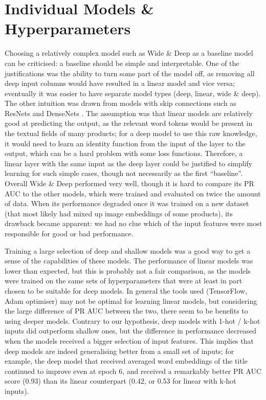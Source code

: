 \section{Individual Models \& Hyperparameters}

Choosing a relatively complex model such as Wide \& Deep as a baseline model can be criticised: a baseline should be simple and interpretable.
One of the justifications was the ability to turn some part of the model off, as removing all deep input columns would have resulted in a linear model and vice versa; eventually it was easier to have separate model types (deep, linear, wide \& deep).
The other intuition was drawn from models with skip connections such as ResNets \cite{resnet} and DenseNets \cite{densenet}.
The assumption was that linear models are relatively good at predicting the output, as the relevant word tokens would be present in the textual fields of many products; for a deep model to use this raw knowledge, it would need to learn an identity function from the input of the layer to the output, which can be a hard problem with some loss functions.
Therefore, a linear layer with the same input as the deep layer could be justified to simplify learning for such simple cases, though not necessarily as the first ``baseline''.
Overall Wide \& Deep performed very well, though it is hard to compare its PR AUC to the other models, which were trained and evaluated on twice the amount of data.
When its performance degraded once it was trained on a new dataset (that most likely had mixed up image embeddings of some products), its drawback became apparent: we had no clue which of the input features were most responsible for good or bad performance.

Training a large selection of deep and shallow models was a good way to get a sense of the capabilities of these models.
The performance of linear models was lower than expected, but this is probably not a fair comparison, as the models were trained on the same sets of hyperparameters that were at least in part chosen to be suitable for deep models.
In general the tools used (TensorFlow, Adam optimiser) may not be optimal for learning linear models, but considering the large difference of PR AUC between the two, there seem to be benefits to using deeper models.
Contrary to our hypothesis, deep models with 1-hot / k-hot inputs did outperform shallow ones, but the difference in performance decreased when the models received a bigger selection of input features.
This implies that deep models are indeed generalising better from a small set of inputs; for example, the deep model that received averaged word embeddings of the title continued to improve even at epoch 6, and received a remarkably better PR AUC score (0.93) than its linear counterpart (0.42, or 0.53 for linear with k-hot inputs).

